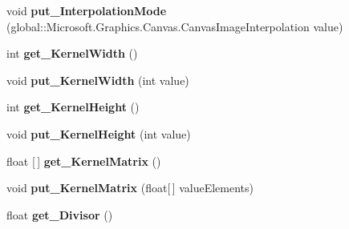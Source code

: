 \begin{DoxyCompactItemize}
void {\bfseries put\+\_\+\+Interpolation\+Mode} (global\+::\+Microsoft.\+Graphics.\+Canvas.\+Canvas\+Image\+Interpolation value)
\item 
\mbox{\label{class_microsoft_1_1_graphics_1_1_canvas_1_1_effects_1_1_convolve_matrix_effect_ada3a96275c0f8088afc7741a987edae5}} 
int {\bfseries get\+\_\+\+Kernel\+Width} ()
\item 
\mbox{\label{class_microsoft_1_1_graphics_1_1_canvas_1_1_effects_1_1_convolve_matrix_effect_a39b3b35b33698ab5ddc9ecef4bef8e24}} 
void {\bfseries put\+\_\+\+Kernel\+Width} (int value)
\item 
\mbox{\label{class_microsoft_1_1_graphics_1_1_canvas_1_1_effects_1_1_convolve_matrix_effect_ad258cae66426351bff2e7f07ee4b142f}} 
int {\bfseries get\+\_\+\+Kernel\+Height} ()
\item 
\mbox{\label{class_microsoft_1_1_graphics_1_1_canvas_1_1_effects_1_1_convolve_matrix_effect_aba12f7fb21ca7b3c6907ee3aca6aa674}} 
void {\bfseries put\+\_\+\+Kernel\+Height} (int value)
\item 
\mbox{\label{class_microsoft_1_1_graphics_1_1_canvas_1_1_effects_1_1_convolve_matrix_effect_a323f695513b440710f21ffe9f3134c49}} 
float \mbox{[}$\,$\mbox{]} {\bfseries get\+\_\+\+Kernel\+Matrix} ()
\item 
\mbox{\label{class_microsoft_1_1_graphics_1_1_canvas_1_1_effects_1_1_convolve_matrix_effect_a9769568f14350c312c98d7b0de2648ba}} 
void {\bfseries put\+\_\+\+Kernel\+Matrix} (float\mbox{[}$\,$\mbox{]} value\+Elements)
\item 
\mbox{\label{class_microsoft_1_1_graphics_1_1_canvas_1_1_effects_1_1_convolve_matrix_effect_af8a1323ed377936a48f2e93d22eb2d17}} 
float {\bfseries get\+\_\+\+Divisor} ()

\end{DoxyCompactItemize}
